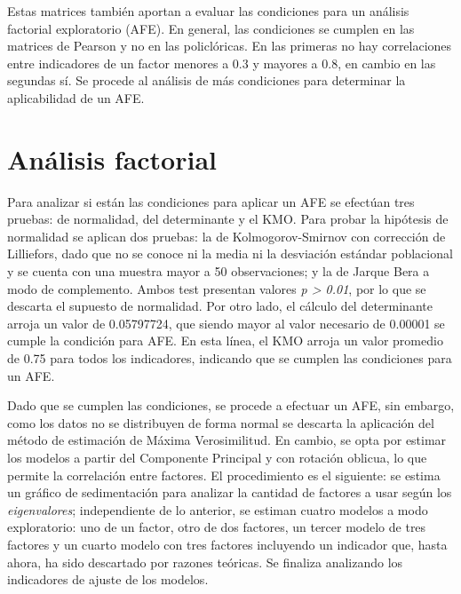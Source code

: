 \documentclass[12pt,twoside]{templates/facsothesis}
\begin{document}
Estas matrices también aportan a evaluar las condiciones para un análisis factorial exploratorio (AFE). En general, las condiciones se cumplen en las matrices de Pearson y no en las policlóricas. En las primeras no hay correlaciones entre indicadores de un factor menores a 0.3 y mayores a 0.8, en cambio en las segundas sí. Se procede al análisis de más condiciones para determinar la aplicabilidad de un AFE.

\hypertarget{anuxe1lisis-factorial}{%
\section{Análisis factorial}\label{anuxe1lisis-factorial}}

Para analizar si están las condiciones para aplicar un AFE se efectúan tres pruebas: de normalidad, del determinante y el KMO. Para probar la hipótesis de normalidad se aplican dos pruebas: la de Kolmogorov-Smirnov con corrección de Lilliefors, dado que no se conoce ni la media ni la desviación estándar poblacional y se cuenta con una muestra mayor a 50 observaciones; y la de Jarque Bera a modo de complemento. Ambos test presentan valores \emph{p \textgreater{} 0.01}, por lo que se descarta el supuesto de normalidad. Por otro lado, el cálculo del determinante arroja un valor de 0.05797724, que siendo mayor al valor necesario de 0.00001 se cumple la condición para AFE. En esta línea, el KMO arroja un valor promedio de 0.75 para todos los indicadores, indicando que se cumplen las condiciones para un AFE.

Dado que se cumplen las condiciones, se procede a efectuar un AFE, sin embargo, como los datos no se distribuyen de forma normal se descarta la aplicación del método de estimación de Máxima Verosimilitud. En cambio, se opta por estimar los modelos a partir del Componente Principal y con rotación oblicua, lo que permite la correlación entre factores. El procedimiento es el siguiente: se estima un gráfico de sedimentación para analizar la cantidad de factores a usar según los \emph{eigenvalores}; independiente de lo anterior, se estiman cuatro modelos a modo exploratorio: uno de un factor, otro de dos factores, un tercer modelo de tres factores y un cuarto modelo con tres factores incluyendo un indicador que, hasta ahora, ha sido descartado por razones teóricas. Se finaliza analizando los indicadores de ajuste de los modelos.
\end{document}
